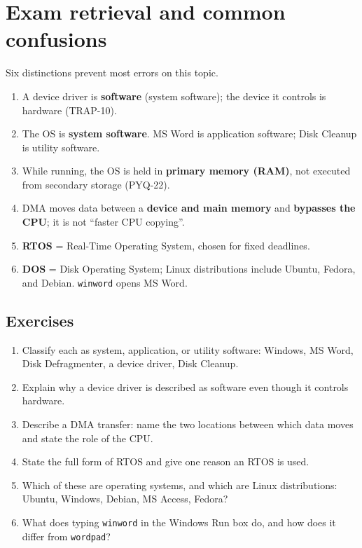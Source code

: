 \section{Exam retrieval and common confusions}
Six distinctions prevent most errors on this topic.
\begin{enumerate}
  \item A device driver is \textbf{software} (system software); the device it
    controls is hardware (TRAP-10).
  \item The OS is \textbf{system software}. MS Word is application software;
    Disk Cleanup is utility software.
  \item While running, the OS is held in \textbf{primary memory (RAM)}, not
    executed from secondary storage (PYQ-22).
  \item DMA moves data between a \textbf{device and main memory} and
    \textbf{bypasses the CPU}; it is not ``faster CPU copying''.
  \item \textbf{RTOS} = Real-Time Operating System, chosen for fixed
    deadlines.
  \item \textbf{DOS} = Disk Operating System; Linux distributions include
    Ubuntu, Fedora, and Debian. \texttt{winword} opens MS Word.
\end{enumerate}

\subsection*{Exercises}
\begin{enumerate}[label=\arabic*.]
  \item Classify each as system, application, or utility software: Windows,
    MS Word, Disk Defragmenter, a device driver, Disk Cleanup.
  \item Explain why a device driver is described as software even though it
    controls hardware.
  \item Describe a DMA transfer: name the two locations between which data
    moves and state the role of the CPU.
  \item State the full form of RTOS and give one reason an RTOS is used.
  \item Which of these are operating systems, and which are Linux
    distributions: Ubuntu, Windows, Debian, MS Access, Fedora?
  \item What does typing \texttt{winword} in the Windows Run box do, and how
    does it differ from \texttt{wordpad}?
\end{enumerate}

